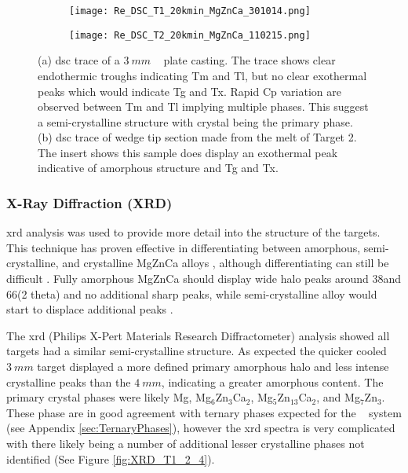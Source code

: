 \documentclass[a4paper,12pt,oneside]{report}%
\begin{document}
\begin{figure}[htbp]
	\centering
	\begin{subfigure}[htbp]{0.49\textwidth}
		\texttt{[image: Re\_DSC\_T1\_20kmin\_MgZnCa\_301014.png]}
		\caption{}
		\label{fig:DSCTarget1}
	\end{subfigure}
	\begin{subfigure}[htbp]{0.49\textwidth}
		\texttt{[image: Re\_DSC\_T2\_20kmin\_MgZnCa\_110215.png]}
		\caption{}
		\label{fig:DSCTarget2}
	\end{subfigure}
	\caption{(a) \acrshort{dsc} trace of a $3~ mm$ \MgZnCa~ plate casting. The trace shows clear endothermic troughs indicating \acrshort{Tm} and \acrshort{Tl}, but no clear exothermal peaks which would indicate \acrshort{Tg} and \acrshort{Tx}. Rapid \acrshort{Cp} variation are observed between \acrshort{Tm} and \acrshort{Tl} implying multiple phases. This suggest a semi-crystalline structure with crystal being the primary phase. (b) \acrshort{dsc} trace of wedge tip section made from the melt of Target 2. The insert shows this sample does display an exothermal peak indicative of amorphous structure and \acrshort{Tg} and \acrshort{Tx}.}%
	\label{fig:DSCTarget1n2}
\end{figure}

\subsubsection{X-Ray Diffraction (XRD)}
\Gls{xrd} analysis was used to provide more detail into the structure of the targets. This technique has proven effective in differentiating between amorphous, semi-crystalline, and crystalline MgZnCa alloys \cite{Schluter2012, Wang2012}, although differentiating can still be difficult \cite{Zhou2013}. Fully amorphous MgZnCa should display wide halo peaks around 38\degree and 66\degree (2 theta) and no additional sharp peaks, while semi-crystalline alloy would start to displace additional peaks \cite{Cao2013b, Gu2005, Wang2012, Gu2010, Cao2012}. 

The \gls{xrd} (Philips X-Pert Materials Research Diffractometer) analysis showed all targets had a similar semi-crystalline structure. As expected the quicker cooled $3~ mm$ target displayed a more defined primary amorphous halo and less intense crystalline peaks than the $4~ mm$, indicating a greater amorphous content. The primary crystal phases were likely Mg, Mg$_{6}$Zn$_{3}$Ca$_{2}$, Mg$_{5}$Zn$_{13}$Ca$_{2}$, and Mg$_{7}$Zn$_{3}$. These phase are in good agreement with ternary phases expected for the \MgZnCa~ system (see Appendix \ref{sec:TernaryPhases}), however the \gls{xrd} spectra is very complicated with there likely being a number of additional lesser crystalline phases not identified (See Figure \ref{fig:XRD_T1_2_4}). 
\end{document}
